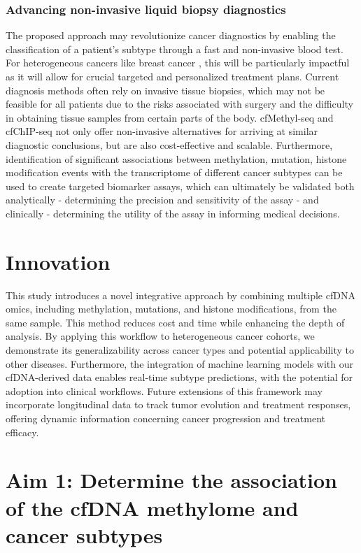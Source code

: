 \documentclass[11pt]{article}
\begin{document}
\subsubsection*{Advancing non-invasive liquid biopsy diagnostics} 
The proposed approach may revolutionize cancer diagnostics by enabling the
classification of a patient's subtype through a fast and non-invasive blood test.
For heterogeneous cancers like breast cancer \cite{guo_breast_2023}, this will be particularly impactful
as it will allow for crucial targeted and personalized treatment plans. 
Current diagnosis methods often rely on invasive tissue biopsies, 
which may not be feasible for all patients due to the risks associated with
surgery and the difficulty in obtaining tissue samples from certain parts of the body.
cfMethyl-seq and cfChIP-seq not only offer non-invasive alternatives for arriving at similar diagnostic conclusions, but are also cost-effective and scalable. \cite{stackpole_cost-effective_2022, trier_maansson_cell-free_2023}
Furthermore, identification of significant associations between methylation, mutation, histone modification events with the transcriptome of different cancer subtypes can be used to create targeted biomarker assays, which can ultimately be validated both analytically - determining the precision and sensitivity of the assay - and clinically - determining the utility of the assay in informing medical decisions. \cite{zhang_unlocking_2023}
\section*{Innovation}
This study introduces a novel integrative approach by combining multiple cfDNA omics, including methylation, mutations, and histone modifications, from the same sample.
This method reduces cost and time while enhancing the depth of analysis. 
By applying this workflow to heterogeneous cancer cohorts, we demonstrate its generalizability across cancer types and potential applicability to other diseases.
Furthermore, the integration of machine learning models with our cfDNA-derived data enables real-time subtype predictions, with the potential for adoption into clinical workflows.
Future extensions of this framework may incorporate longitudinal data to track tumor evolution and treatment responses, offering dynamic information concerning cancer progression and treatment efficacy.
\newpage
\section*{Aim 1: Determine the association of the cfDNA methylome and cancer subtypes}
\end{document}
